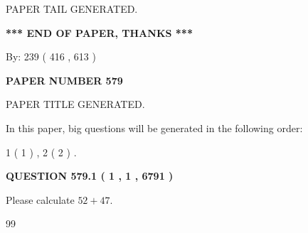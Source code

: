 \documentclass[12pt]{article}
\begin{document}
   
   
\vspace{2.0in} PAPER TAIL GENERATED.
   
   
   
   
\vspace{1.0in} 
{\textbf{\large{ *** END OF PAPER, THANKS *** }}} 
   
   
\hspace{1.0in} By: 
 239 ( 416 ,  613 )
   
   
   
   
\newpage 
\setcounter{page}{ 
   579001 } 
   
   
   
   
 {\textbf{ \Large{ PAPER NUMBER  579  }}}
   
   
\vspace{0.2in}
   
   
   
   
   
   
   
   
 \vspace{0.2in}
 
 
 
 
   
   
 PAPER TITLE GENERATED.
   
   
   
\vspace{0.2in}
   
In this paper, big questions will be generated in the following order: 
   
   
   1 ( 1 )
 ,
   2 ( 2 )
 .
  
\vspace{0.2in}
  
{\textbf{\Large{QUESTION
579.1 
 ( 1 , 1 , 6791 )
}}}
  
  
 
Please calculate $ %
52 +  %
47 $.
 
 
 
\noindent{}
 
 

99
 
 
\noindent{}
 
 

 
 
 
\noindent{}
 
\end{document}
